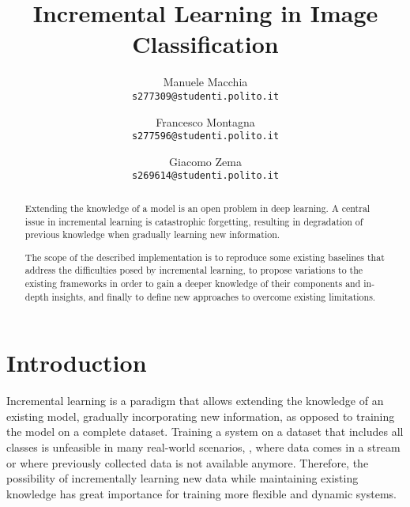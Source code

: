 \documentclass[10pt,twocolumn,letterpaper]{article}
\begin{document}
\title{Incremental Learning in Image Classification}

\author{Manuele Macchia\\
{\tt\small s277309@studenti.polito.it}
\and
Francesco Montagna\\
{\tt\small s277596@studenti.polito.it}
\and
Giacomo Zema\\
{\tt\small s269614@studenti.polito.it}
}

\maketitle

\begin{abstract}
    Extending the knowledge of a model is an open problem in deep learning. A central issue in incremental learning is catastrophic forgetting, resulting in degradation of previous knowledge when gradually learning new information.

    The scope of the described implementation is to reproduce some existing baselines that address the difficulties posed by incremental learning, to propose variations to the existing frameworks in order to gain a deeper knowledge of their components and in-depth insights, and finally to define new approaches to overcome existing limitations.
\end{abstract}

\section{Introduction}
Incremental learning is a paradigm that allows extending the knowledge of an existing model, gradually incorporating new information, as opposed to training the model on a complete dataset. Training a system on a dataset that includes all classes is unfeasible in many real-world scenarios, \eg, where data comes in a stream or where previously collected data is not available anymore. Therefore, the possibility of incrementally learning new data while maintaining existing knowledge has great importance for training more flexible and dynamic systems.
\end{document}
